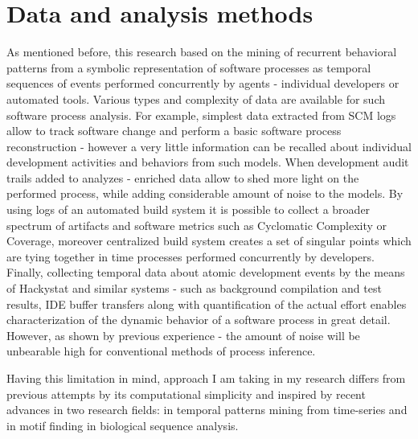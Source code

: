 \documentclass{sig-alternate}
\begin{document}
\section{Data and analysis methods}
As mentioned before, this research based on the mining of recurrent behavioral patterns from a symbolic representation of software processes as temporal sequences of events performed concurrently by agents - individual developers or automated tools. Various types and complexity of data are available for such software process analysis. For example, simplest data extracted from SCM logs allow to track software change and perform a basic software process reconstruction - however a very little information can be recalled about individual development activities and behaviors from such models. When development audit trails added to analyzes - enriched data allow to shed more light on the performed process, while adding considerable amount of noise to the models. By using logs of an automated build system it is possible to collect a broader spectrum of artifacts and software metrics such as Cyclomatic Complexity or Coverage, moreover centralized build system creates a set of singular points which are tying together in time processes performed concurrently by developers. Finally, collecting temporal data about atomic development events by the means of Hackystat and similar systems - such as background compilation and test results, IDE buffer transfers along with quantification of the actual effort enables characterization of the dynamic behavior of a software process in great detail. However, as shown by previous experience - the amount of noise will be unbearable high for conventional methods of process inference.

Having this limitation in mind, approach I am taking in my research differs from previous attempts by its computational simplicity and inspired by recent advances in two research fields: in temporal patterns mining from time-series and in motif finding in biological sequence analysis. 
\end{document}

